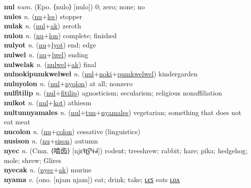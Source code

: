 \textbf{nul} \textit{num.} (Epo. ⟨nulo⟩ [nulo])
0; zero; none; no \label{nul} \\
\textbf{nules} \textit{n.} (\hyperref[nu]{nu}+\hyperref[les]{les})
stopper \label{nules} \\
\textbf{nulak} \textit{n.} (\hyperref[nul]{nul}+\hyperref[ak]{ak})
zeroth \label{nulak} \\
\textbf{nulon} \textit{n.} (\hyperref[nu]{nu}+\hyperref[lon]{lon})
complete; finished \label{nulon} \\
\textbf{nulyot} \textit{n.} (\hyperref[nu]{nu}+\hyperref[lyot]{lyot})
end; edge \label{nulyot} \\
\textbf{nulwel} \textit{n.} (\hyperref[nu]{nu}+\hyperref[lwel]{lwel})
ending \label{nulwel} \\
\textbf{nulwelak} \textit{n.} (\hyperref[nulwel]{nulwel}+\hyperref[ak]{ak})
final \label{nulwelak} \\
\textbf{nulnokipumkwelwel} \textit{n.} (\hyperref[nul]{nul}+\hyperref[noki]{noki}+\hyperref[pumkwelwel]{pumkwelwel})
kindergarden \label{nulnokipumkwelwel} \\
\textbf{nulnyolon} \textit{n.} (\hyperref[nul]{nul}+\hyperref[nyolon]{nyolon})
at all; nonzero \label{nulnyolon} \\
\textbf{nulfitilip} \textit{n.} (\hyperref[nul]{nul}+\hyperref[fitilip]{fitilip})
agnosticism; secularism; religious nonaffiliation \label{nulfitilip} \\
\textbf{nulkot} \textit{n.} (\hyperref[nul]{nul}+\hyperref[kot]{kot})
athiesm \label{nulkot} \\
\textbf{nultunnyamales} \textit{n.} (\hyperref[nul]{nul}+\hyperref[tun]{tun}+\hyperref[nyamales]{nyamales})
vegetarian; something that does not eat meat \label{nultunnyamales} \\
\textbf{nucolon} \textit{n.} (\hyperref[nu]{nu}+\hyperref[colon]{colon})
cessative (linguistics) \label{nucolon} \\
\textbf{nusison} \textit{n.} (\hyperref[nu]{nu}+\hyperref[sison]{sison})
autumn \label{nusison} \\
\textbf{nyec} \textit{n.} (Cmn. ⟨啮齿⟩ [njɛ˥˩ʈ͡ʂʰɨ˧˩˧])
rodent; treeshrew; rabbit; hare; pika; hedgehog; mole; shrew; Glires \label{nyec} \\
\textbf{nyecak} \textit{n.} (\hyperref[nyec]{nyec}+\hyperref[ak]{ak})
murine \label{nyecak} \\
\textbf{nyama} \textit{v.} (ono. [njam njam])
eat; drink; take; \hyperref[nyamales]{ʟєꜱ} eats \hyperref[nyamalon]{ʟᴏᴧ} \label{nyama} \\
